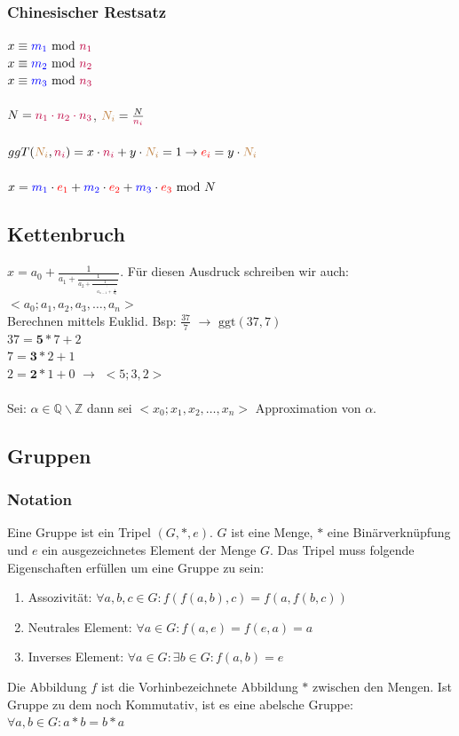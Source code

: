\documentclass[landscape,twocolumn,a4paper]{article}
\newcommand{\T}[1]{\text{#1}} %
\begin{document}
\subsubsection{Chinesischer Restsatz}
 $x\equiv {\color{blue}m_1}\T{ mod }{\color{purple}n_1}$ \\
 $x\equiv {\color{blue}m_2}\T{ mod }{\color{purple}n_2}$\\
 $x\equiv {\color{blue}m_3}\T{ mod }{\color{purple}n_3}$\\
\\
$N={\color{purple}n_1\cdot n_2 \cdot n_3}$, 
${\color{brown}N_i}=\frac{N}{\color{purple}n_i}$\\
\\
$ggT({\color{brown}N_i},{\color{purple}n_i})=x\cdot {\color{purple}n_i}+y\cdot {\color{brown}N_i} = 1 \to {\color{red}e_i}=y\cdot {\color{brown}N_i}$ \\
 \\
 $x={\color{blue}m_1}\cdot {\color{red}e_1}+{\color{blue}m_2}\cdot {\color{red}e_2}+{\color{blue}m_3}\cdot {\color{red}e_3}\T{ mod } N$ 
 
\subsection{Kettenbruch}
$x=a_0+\frac{1}{a_1+\frac{1}{a_2+\frac{1}{\quad\stackrel{\vdots}{a_{n-1}+\frac{1}{a_n}}}}}$. Für diesen Ausdruck schreiben wir auch: $<a_0;a_1,a_2,a_3,\ldots,a_n>$ \\
Berechnen mittels Euklid. Bsp: $\frac{37}{7}$ $\rightarrow$ $\text{ggt}(37, 7)$\\
$37 = \textbf{5}*7 + 2$\\
$7 = \textbf{3}*2 + 1$\\
$2 = \textbf{2}*1 + 0$ $\rightarrow$ $<5;3,2>$ \\
\\
Sei: $\alpha \in \mathbb{Q} \backslash \mathbb{Z}$ dann sei $<x_0; x_1, x_2, \ldots, x_n>$ Approximation von $\alpha$.

\subsection{Gruppen}
\subsubsection{Notation}
Eine Gruppe ist ein Tripel $(G, *, e)$. $G$ ist eine Menge, $*$ eine Binärverknüpfung und $e$ ein ausgezeichnetes Element der Menge $G$. Das Tripel muss folgende Eigenschaften erfüllen um eine Gruppe zu sein:
\begin{enumerate}
	\item Assozivität: $\forall a,b,c \in G : f(f(a,b),c) = f(a,f(b,c))$
	\item Neutrales Element: $\forall a \in G : f(a,e) = f(e,a) = a$
	\item Inverses Element: $\forall a \in G:\exists b \in G:f(a,b)=e$
\end{enumerate}
Die Abbildung $f$ ist die Vorhinbezeichnete Abbildung $*$ zwischen den Mengen. Ist Gruppe zu dem noch Kommutativ, ist es eine abelsche Gruppe: $\forall a, b \in G : a * b = b * a$
\end{document}
